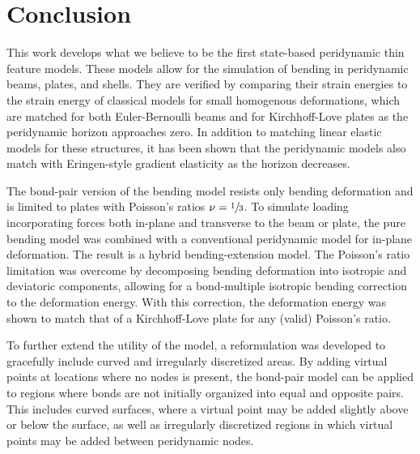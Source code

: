 \chapter{Conclusion}
\label{ch:Conclusion}

This work develops what we believe to be the first state-based peridynamic thin feature models.
These models allow for the simulation of bending in peridynamic beams, plates, and shells.
They are verified by comparing their strain energies to the strain energy of classical models for small homogenous deformations, which are matched for both Euler-Bernoulli beams and for Kirchhoff-Love plates as the peridynamic horizon approaches zero.
In addition to matching linear elastic models for these structures, it has been shown that the peridynamic models also match with Eringen-style gradient elasticity as the horizon decreases.

The bond-pair version of the bending model resists only bending deformation and is limited to plates with Poisson's ratios $\nu = \sfrac{1}{3}$.
To simulate loading incorporating forces both in-plane and transverse to the beam or plate, the pure bending model was combined with a conventional peridynamic model for in-plane deformation.
The result is a hybrid bending-extension model.
The Poisson's ratio limitation was overcome by decomposing bending deformation into isotropic and deviatoric components, allowing for a bond-multiple isotropic bending correction to the deformation energy.
With this correction, the deformation energy was shown to match that of a Kirchhoff-Love plate for any (valid) Poisson's ratio.

To further extend the utility of the model, a reformulation was developed to gracefully include curved and irregularly discretized areas.
By adding virtual points at locations where no nodes is present, the bond-pair model can be applied to regions where bonds are not initially organized into equal and opposite pairs.
This includes curved surfaces, where a virtual point may be added slightly above or below the surface, as well as irregularly discretized regions in which virtual points may be added between peridynamic nodes.

